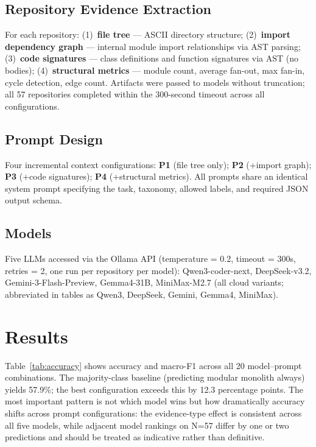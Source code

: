 \documentclass[runningheads]{llncs}
\begin{document}
\subsection{Repository Evidence Extraction}

For each repository: (1)~\textbf{file tree} --- ASCII directory structure; (2)~\textbf{import dependency graph} --- internal module import relationships via AST parsing; (3)~\textbf{code signatures} --- class definitions and function signatures via AST (no bodies); (4)~\textbf{structural metrics} --- module count, average fan-out, max fan-in, cycle detection, edge count. Artifacts were passed to models without truncation; all 57 repositories completed within the 300-second timeout across all configurations.

\subsection{Prompt Design}
\label{sec:prompts}

Four incremental context configurations: \textbf{P1} (file tree only); \textbf{P2} (+import graph); \textbf{P3} (+code signatures); \textbf{P4} (+structural metrics). All prompts share an identical system prompt specifying the task, taxonomy, allowed labels, and required JSON output schema.

\subsection{Models}
\label{sec:models}

Five LLMs accessed via the Ollama API (temperature = 0.2, timeout = 300s, retries = 2, one run per repository per model): Qwen3-coder-next, DeepSeek-v3.2, Gemini-3-Flash-Preview, Gemma4-31B, MiniMax-M2.7 (all cloud variants; abbreviated in tables as Qwen3, DeepSeek, Gemini, Gemma4, MiniMax).

\section{Results}
\label{sec:results}

Table~\ref{tab:accuracy} shows accuracy and macro-F1 across all 20 model--prompt combinations. The majority-class baseline (predicting modular monolith always) yields 57.9\%; the best configuration exceeds this by 12.3 percentage points. The most important pattern is not which model wins but how dramatically accuracy shifts across prompt configurations: the evidence-type effect is consistent across all five models, while adjacent model rankings on N=57 differ by one or two predictions and should be treated as indicative rather than definitive.
\end{document}
